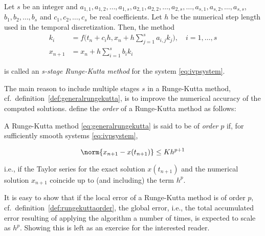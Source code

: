 \begin{Def}
    \label{def:generalrungekutta}
    Let $s$ be an integer and $a_{1,1},a_{1,2},\ldots,a_{1,s},a_{2,1},
    a_{2,2},\ldots,a_{2,s},\ldots,a_{s,1},a_{s,2},\ldots,a_{s,s}$,
    $b_{1},b_{2},\ldots,b_{s}$ and $c_{1},c_{2},\ldots,c_{s}$ be real
    coefficients. Let $h$ be the numerical step length used in the
    temporal discretization. Then, the method
\begin{equation}
    \label{eq:generalrungekutta}
    \begin{aligned}
        k_{i} &= f\bigg(t_{n}+c_{i}h,x_{n}+
                h\sum\limits_{j=1}^{s}a_{i,j}k_{j}\bigg),\quad{}i=1,\ldots,s\\
        x_{n+1} &= x_{n} + h\sum\limits_{i=1}^{s}b_{i}k_{i}
    \end{aligned}
\end{equation}

is called an \emph{s-stage Runge-Kutta method} for the system
\eqref{eq:ivpsystem}.
\end{Def}

The main reason to include multiple stages $s$ in a Runge-Kutta method, cf.\
definition~\ref{def:generalrungekutta}, is to improve the numerical accuracy
of the computed solutions.
\textcite[p.2 in the 2010 printing]{hairer1993solving} define the \emph{order}
of a Runge-Kutta method as follows:\\

\begin{Def}
    \label{def:rungekuttaorder}
    A Runge-Kutta method \eqref{eq:generalrungekutta} is said to be of
    \emph{order} $p$ if, for sufficiently smooth systems \eqref{eq:ivpsystem},

    \begin{equation}
        \label{eq:rungekuttaorder}
        \norm{x_{n+1}-x(t_{n+1})} \leq Kh^{p+1}
    \end{equation}

    i.e., if the Taylor series for the exact solution $x(t_{n+1})$ and the
    numerical solution $x_{n+1}$ coincide up to (and including) the term $h^p$.
\end{Def}

It is easy to show that if the local error of a Runge-Kutta method is of order
$p$, cf.\ definition~\ref{def:rungekuttaorder}, the global error, i.e., the
total accumulated error resulting of applying the algorithm a number of times,
is expected to scale as $h^{p}$. Showing this is left as an exercise for the
interested reader.

